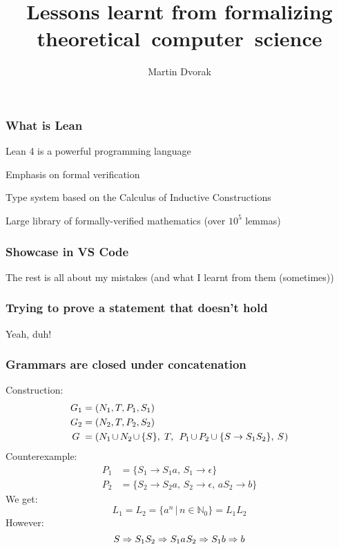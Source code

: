 \documentclass{beamer}
\title{Lessons learnt from formalizing theoretical~computer~science}
\author{Martin Dvorak}
\begin{document}
\begin{frame}[plain]
\maketitle
\end{frame}

\begin{frame}
\frametitle{What is Lean}
Lean 4 is a powerful programming language

Emphasis on formal verification

Type system based on the Calculus of Inductive Constructions

Large library of formally-verified mathematics (over $10^5$ lemmas)
\end{frame}

\begin{frame}
\frametitle{Showcase in VS Code}
\pause
The rest is all about my mistakes
\pause (and what I learnt from them
\pause (sometimes))
\end{frame}

\begin{frame}
\frametitle{Trying to prove a statement that doesn't hold}
\pause
Yeah, duh!
\end{frame}

\begin{frame}
\frametitle{Grammars are closed under concatenation}
\pause
Construction:
\begin{align*} 
	G_1 &= ( N_1, T, P_1, S_1 ) \\ 
	G_2 &= ( N_2, T, P_2, S_2 ) \\
	G\; &= ( N_1 \mskip-2mu\cup\mskip-1mu N_2 \mskip-2mu\cup\mskip-1mu \{ S \},\;
	T,\;\, P_1 \mskip-2mu\cup\mskip-1mu P_2
	\mskip-1mu\cup \{ S \rightarrow S_1 S_2 \},\: S\mskip1mu )
\end{align*}
\pause
Counterexample:
\begin{align*}
	P_1 &= \{ S_1 \rightarrow S_1 a,\, S_1 \rightarrow \epsilon \} \\
	P_2 &= \{ S_2 \rightarrow S_2 a,\, S_2 \rightarrow \epsilon,\, a S_2 \rightarrow b \}
\end{align*}
\pause
We get:
$$ L_1 = L_2 = \{ a^n \,|\, n \in \mathbb{N}_0 \} = L_1 L_2 $$
\pause
However:
$$ S \Rightarrow S_1 S_2 \Rightarrow S_1 a\mskip1mu S_2 \Rightarrow S_1 b \Rightarrow b $$
\end{frame}
\end{document}
